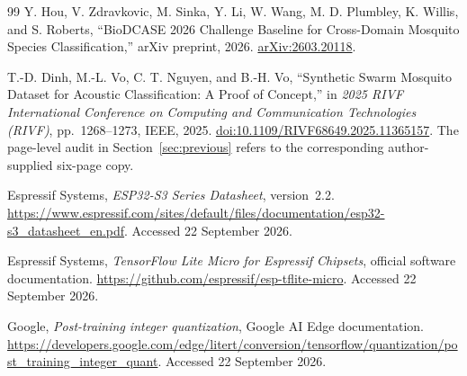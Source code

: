 \documentclass[a4paper,11pt]{article}
\begin{document}
\begin{thebibliography}{99}
Y. Hou, V. Zdravkovic, M. Sinka, Y. Li, W. Wang, M. D. Plumbley, K. Willis, and S. Roberts,
``BioDCASE 2026 Challenge Baseline for Cross-Domain Mosquito Species Classification,''
arXiv preprint, 2026.
\href{https://arxiv.org/abs/2603.20118}{arXiv:2603.20118}.

T.-D. Dinh, M.-L. Vo, C. T. Nguyen, and B.-H. Vo,
``Synthetic Swarm Mosquito Dataset for Acoustic Classification: A Proof of Concept,''
in \textit{2025 RIVF International Conference on Computing and Communication Technologies (RIVF)},
pp.~1268--1273, IEEE, 2025.
\href{https://doi.org/10.1109/RIVF68649.2025.11365157}{doi:10.1109/RIVF68649.2025.11365157}.
The page-level audit in Section~\ref{sec:previous} refers to the corresponding author-supplied six-page copy.

Espressif Systems, \textit{ESP32-S3 Series Datasheet}, version~2.2.
\url{https://www.espressif.com/sites/default/files/documentation/esp32-s3_datasheet_en.pdf}.
Accessed 22 September 2026.

Espressif Systems, \textit{TensorFlow Lite Micro for Espressif Chipsets}, official software documentation.
\url{https://github.com/espressif/esp-tflite-micro}. Accessed 22 September 2026.

Google, \textit{Post-training integer quantization}, Google AI Edge documentation.
\url{https://developers.google.com/edge/litert/conversion/tensorflow/quantization/post_training_integer_quant}.
Accessed 22 September 2026.
\end{thebibliography}
\end{document}
